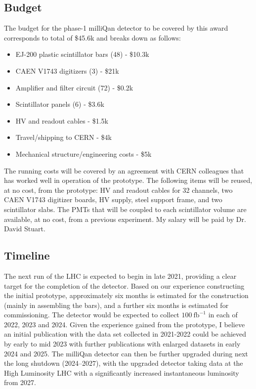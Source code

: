 \documentclass[11pt]{article}
\theoremstyle{plain} \numberwithin{equation}{section}
\theoremstyle{definition}
\begin{document}
\subsection*{Budget}

The budget for the phase-1 milliQan detector to be covered by this award corresponds to total of \$45.6k and
breaks down as follows:

\begin{itemize}
    \item EJ-200 plastic scintillator bars (48) - \$10.3k
    \item CAEN V1743 digitizers (3) - \$21k
    \item Amplifier and filter circuit (72)  - \$0.2k
    \item Scintillator panels (6) - \$3.6k
    \item HV and readout cables - \$1.5k
    \item Travel/shipping to CERN - \$4k
    \item Mechanical structure/engineering costs - \$5k
\end{itemize}

The running costs will be covered by an agreement with CERN colleagues that has 
worked well in operation of the prototype. The following items will be reused, at no 
cost, from the prototype: HV and readout cables for 32 channels, two CAEN V1743 digitizer boards,
HV supply, steel support frame, and two scintillator slabs. The PMTs that will be coupled to each scintillator volume
are available, at no cost, from a previous experiment. My salary will be paid by
Dr. David Stuart.

\subsection*{Timeline}

The next run of the LHC is expected to begin in late 2021, providing a clear target 
for the completion of the detector. Based on our experience constructing the initial prototype, 
approximately six months is estimated for the construction (mainly in assembling the bars),
and a further six months is estimated for commissioning. The detector would be expected to 
collect $100~\text{fb}^{-1}$ in each of 2022, 2023 and 2024.
Given the experience gained from the prototype, I believe an initial publication with the data set collected 
in 2021-2022 could be achieved by early to mid 2023 with further publications with enlarged datasets 
in early 2024 and 2025. The milliQan detector can then be further 
upgraded during next the long shutdown (2024--2027), with the upgraded
detector taking data at the High Luminosity LHC with a significantly increased instantaneous luminosity from 2027. 




\end{document}
